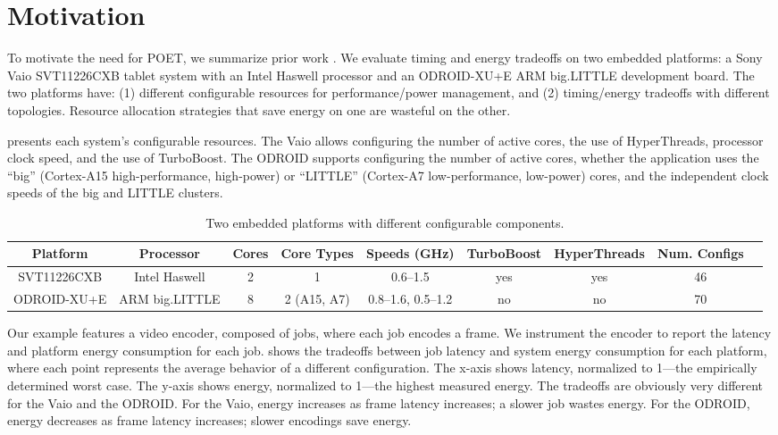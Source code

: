\section{Motivation}
\label{sec:poet-motivation}

To motivate the need for POET, we summarize prior work \cite{Imes2014}.
We evaluate timing and energy tradeoffs on two embedded platforms: a Sony Vaio SVT11226CXB tablet system with an Intel Haswell processor and an ODROID-XU+E ARM big.LITTLE development board.
The two platforms have: (1) different configurable resources for performance/power management, and (2) timing/energy tradeoffs with different topologies.
Resource allocation strategies that save energy on one are wasteful on the other.

 presents each system's configurable resources.
The Vaio allows configuring the number of active cores, the use of HyperThreads, processor clock speed, and the use of TurboBoost.
The ODROID supports configuring the number of active cores, whether the application uses the ``big'' (Cortex-A15 high-performance, high-power) or ``LITTLE'' (Cortex-A7 low-performance, low-power) cores, and the independent clock speeds of the big and LITTLE clusters.

\begin{table}[t]
\caption{Two embedded platforms with different configurable components.}
\label{tbl:poet-machines}
\tiny
\centering
\begin{tabular}{ccccccccc}
  \textbf{Platform} & 
  \textbf{Processor} &
  \textbf{Cores} & 
  \textbf{Core Types} &
  \textbf{Speeds (GHz)} &
  \textbf{TurboBoost} &
  \textbf{HyperThreads} & 
  \textbf{Num. Configs} \\
  \hline
  \hline
  SVT11226CXB & Intel Haswell  & 2 & 1             & 0.6--1.5           & yes & yes & 46 \\
  ODROID-XU+E & ARM big.LITTLE & 8 & 2 (A15, A7)   & 0.8--1.6, 0.5--1.2 & no  & no  & 70 \\
  \hline 
  \hline
\end{tabular}
\end{table}

Our example features a video encoder, composed of jobs, where each job encodes a frame.
We instrument the encoder to report the latency and platform energy consumption for each job.
 shows the tradeoffs between job latency and system energy consumption for each platform, where each point represents the average behavior of a different configuration.
The x-axis shows latency, normalized to 1---the empirically determined worst case.
The y-axis shows energy, normalized to 1---the highest measured energy.
The tradeoffs are obviously very different for the Vaio and the ODROID.
For the Vaio, energy increases as frame latency increases; \ie a slower job wastes energy.
For the ODROID, energy decreases as frame latency increases; \ie slower encodings save energy.

